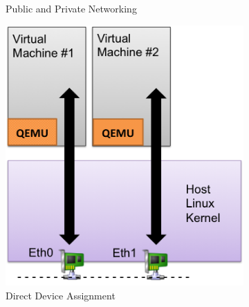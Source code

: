 \begin{enumerate}
\begin{figure}
\begin{subfigure}[b]{0.35\textwidth}
                \caption{Public and Private Networking}
                \label{fig:kvm-internal}
        \end{subfigure}
        \quad \hspace{8 mm}
        \begin{subfigure}[b]{0.35\textwidth}
                \includegraphics[width=\textwidth]{kvm-direct.png}
                \caption{Direct Device Assignment}
                \label{fig:kvm-direct}
        \end{subfigure}
\newline \newline
        \begin{subfigure}[b]{0.35\textwidth}

\end{subfigure}
\end{figure}
\end{enumerate}
